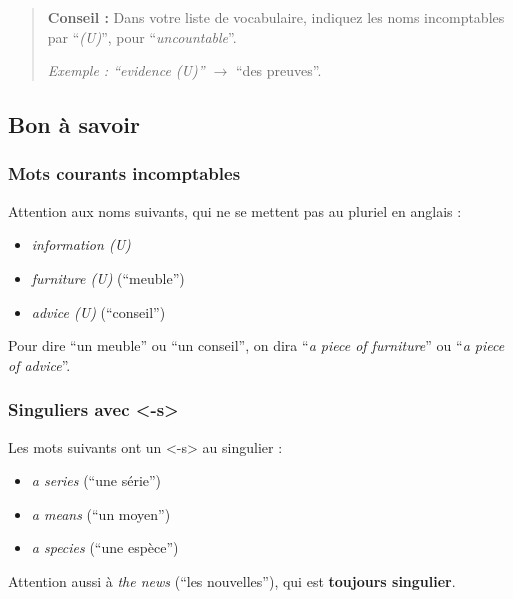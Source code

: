 \documentclass[
  10pt,
]{article}
\providecommand{\tightlist}{%
  \setlength{\itemsep}{0pt}\setlength{\parskip}{0pt}}
\begin{document}
\begin{quote}
\textbf{Conseil :} Dans votre liste de vocabulaire, indiquez les noms incomptables par ``\emph{(U)}'', pour ``\emph{uncountable}''.

\emph{Exemple : ``evidence (U)'' \(\rightarrow\)} ``des preuves''.
\end{quote}

\hypertarget{bon-uxe0-savoir}{%
\subsection{Bon à savoir}\label{bon-uxe0-savoir}}

\hypertarget{mots-courants-incomptables}{%
\subsubsection{Mots courants incomptables}\label{mots-courants-incomptables}}

Attention aux noms suivants, qui ne se mettent pas au pluriel en anglais :

\begin{itemize}
\tightlist
\item
  \emph{information (U)}
\item
  \emph{furniture (U)} (``meuble'')
\item
  \emph{advice (U)} (``conseil'')
\end{itemize}

Pour dire ``un meuble'' ou ``un conseil'', on dira ``\emph{a piece of furniture}'' ou ``\emph{a piece of advice}''.

\hypertarget{singuliers-avec--s}{%
\subsubsection{Singuliers avec \textless-s\textgreater{}}\label{singuliers-avec--s}}

Les mots suivants ont un \textless-s\textgreater{} au singulier :

\begin{itemize}
\tightlist
\item
  \emph{a series} (``une série'')
\item
  \emph{a means} (``un moyen'')
\item
  \emph{a species} (``une espèce'')
\end{itemize}

Attention aussi à \color[HTML]{f44336}\emph{the news} \color{black} (``les nouvelles''), qui est \textbf{toujours singulier}.
\end{document}
